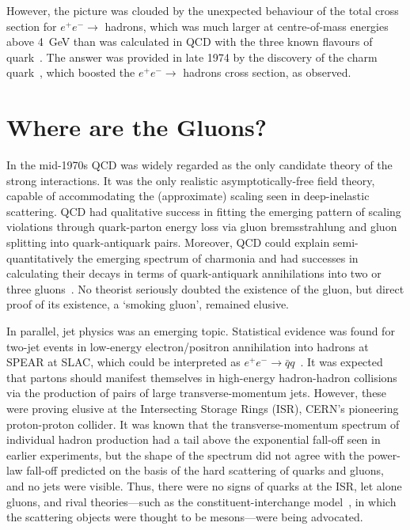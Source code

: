 \documentclass{ws-rv975x65}[12pt]
\begin{document}
However, the picture was clouded by the unexpected behaviour of the
total cross section for $e^+ e^- \to$ hadrons, which was much larger
at centre-of-mass energies above 4~GeV than was calculated in QCD
with the three known flavours of quark~\cite{JELondon}. The answer was provided in late
1974 by the discovery of the charm quark~\cite{RT}, which boosted the
$e^+ e^- \to$ hadrons cross section, as observed.

\section{Where are the Gluons?}

In the mid-1970s QCD was widely regarded as the only candidate theory of the strong interactions.
It was the only realistic asymptotically-free field theory, capable of
accommodating the (approximate) scaling seen in deep-inelastic scattering. QCD had
qualitative success in fitting the emerging pattern of scaling violations through quark-parton
energy loss via gluon bremsstrahlung and gluon splitting into quark-antiquark pairs. Moreover, QCD could
explain semi-quantitatively the emerging spectrum of charmonia and had successes in calculating their decays
in terms of quark-antiquark annihilations into two or three gluons~\cite{AP}.
No theorist seriously doubted the existence of the gluon, but direct proof of its existence,
a `smoking gluon', remained elusive.

In parallel, jet physics was an emerging topic. Statistical evidence was found for two-jet events in low-energy
electron/positron annihilation into hadrons at SPEAR at SLAC, which could be interpreted as $e^+ e^- \to {\bar q} q$~\cite{Hanson}.
It was expected that partons should manifest themselves in high-energy hadron-hadron collisions via the
production of pairs of large transverse-momentum jets. However, these were proving elusive at the
Intersecting Storage Rings (ISR), CERN's pioneering proton-proton collider.
It was known that the transverse-momentum spectrum of individual hadron production had a tail above the
exponential fall-off seen in earlier experiments, but the shape of the spectrum did not agree with the
power-law fall-off predicted on the basis of the hard scattering of quarks and gluons,
and no jets were visible. Thus, there were no signs of quarks at the ISR, let alone gluons,
and rival theories---such as the constituent-interchange model~\cite{CIM}, in which the scattering objects were
thought to be mesons---were being advocated.
\end{document}
